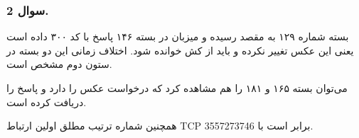 \subsubsection*{سوال 2.}

{
}

بسته شماره ۱۲۹ به مقصد رسیده و میزبان در بسته ۱۴۶ پاسخ با کد ۳۰۰ داده است یعنی این عکس تغییر نکرده و باید از کش خوانده شود. اختلاف زمانی این دو بسته در ستون دوم مشخص است.

می‌توان بسته ‍۱۶۵ و ۱۸۱ را هم مشاهده کرد که درخواست عکس را دارد و پاسخ 
را دریافت کرده است.


{
}

همچنین شماره ترتیب مطلق اولین ارتباط TCP برابر است با 
3557273746.

